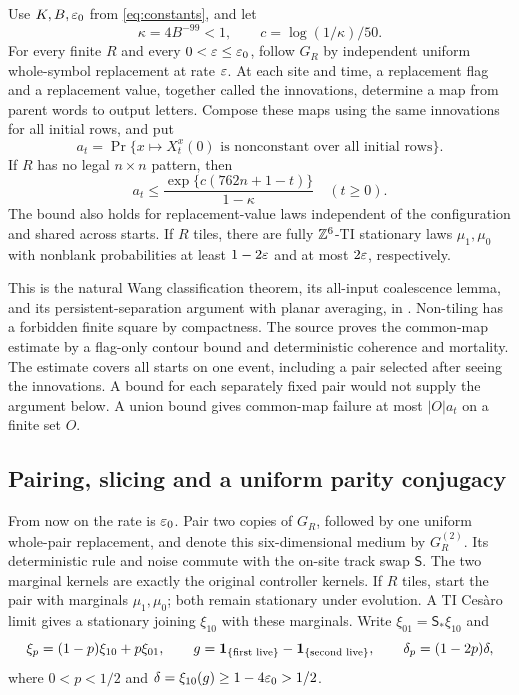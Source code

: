 \begin{theorem}\label{thm:import}
Use $K,B,\varepsilon_0$ from \eqref{eq:constants}, and let
\[
 \kappa=4B^{-99}<1,\qquad c=\log(1/\kappa)/50.
\]
For every finite $R$ and every $0<\varepsilon\le\varepsilon_0$, follow $G_R$ by independent uniform whole-symbol replacement at rate $\varepsilon$. At each site and time, a replacement flag and a replacement value, together called the innovations, determine a map from parent words to output letters. Compose these maps using the same innovations for all initial rows, and put
\[
 a_t=\Pr\{x\mapsto X_t^x(0)\text{ is nonconstant over all initial rows}\}.
\]
If $R$ has no legal $n\times n$ pattern, then
\begin{equation}\label{eq:import-decay}
 a_t\le\frac{\exp\{c(762n+1-t)\}}{1-\kappa}\quad(t\ge0).
\end{equation}
The bound also holds for replacement-value laws independent of the configuration and shared across starts. If $R$ tiles, there are fully $\mathbb Z^6$-TI stationary laws $\mu_1,\mu_0$ with nonblank probabilities at least $1-2\varepsilon$ and at most $2\varepsilon$, respectively.
\end{theorem}

This is the natural Wang classification theorem, its all-input coalescence lemma, and its persistent-separation argument with planar averaging, in \cite[Theorem~2.1, Lemmas~2.10 and~2.13, and Section~2.20]{DMforget}. Non-tiling has a forbidden finite square by compactness. The source proves the common-map estimate by a flag-only contour bound and deterministic coherence and mortality. The estimate covers all starts on one event, including a pair selected after seeing the innovations. A bound for each separately fixed pair would not supply the argument below. A union bound gives common-map failure at most $|O|a_t$ on a finite set $O$.

\subsection{Pairing, slicing and a uniform parity conjugacy}
From now on the rate is $\varepsilon_0$. Pair two copies of $G_R$, followed by one uniform whole-pair replacement, and denote this six-dimensional medium by $G_R^{(2)}$. Its deterministic rule and noise commute with the on-site track swap $\mathsf S$. The two marginal kernels are exactly the original controller kernels. If $R$ tiles, start the pair with marginals $\mu_1,\mu_0$; both remain stationary under evolution. A TI Ces\`aro limit gives a stationary joining $\xi_{10}$ with these marginals. Write $\xi_{01}=\mathsf S_*\xi_{10}$ and
\begin{equation}\label{eq:kp}
 \xi_p=(1-p)\xi_{10}+p\xi_{01},\qquad
 g=\mathbf 1_{\{\text{first live}\}}-\mathbf 1_{\{\text{second live}\}},
 \qquad \delta_p=(1-2p)\delta,
\end{equation}
where $0<p<1/2$ and $\delta=\xi_{10}(g)\ge1-4\varepsilon_0>1/2$.

